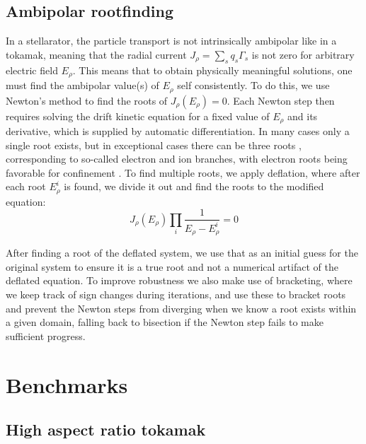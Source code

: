 \documentclass[11pt]{article}
\begin{document}
\subsection{Ambipolar rootfinding}
\label{sec:ambipolar}

In a stellarator, the particle transport is not intrinsically ambipolar like in a tokamak,
meaning that the radial current $J_\rho = \sum_s q_s \Gamma_s$ is not zero for arbitrary
electric field $E_\rho$. This means that to obtain physically meaningful solutions,
one must find the ambipolar value(s) of $E_\rho$ self consistently. To do this, we use
Newton's method to find the roots of $J_\rho(E_\rho) = 0$. Each Newton step then requires
solving the drift kinetic equation for a fixed value of $E_\rho$ and its derivative, which
is supplied by automatic differentiation. In many cases only a single root exists, but
in exceptional cases there can be three roots \cite{hastings1985ambipolar}, corresponding
to so-called electron and ion branches, with electron roots being favorable for
confinement \cite{helander2024optimised}. To find multiple roots, we apply deflation,
where after each root $E_\rho^i$ is found, we divide it out and find the roots to the
modified equation:
\begin{equation}
J_\rho(E_\rho)\prod_i \frac{1}{E_\rho - E_\rho^i} = 0
\end{equation}

After finding a root of the deflated system, we use that as an initial guess for the
original system to ensure it is a true root and not a numerical artifact of the deflated
equation. To improve robustness we also make use of bracketing, where we keep track of
sign changes during iterations, and use these to bracket roots and prevent the Newton
steps from diverging when we know a root exists within a given domain, falling back to
bisection if the Newton step fails to make sufficient progress.


\section{Benchmarks}
\label{sec:benchmarks}


\subsection{High aspect ratio tokamak}
\label{sec:benchmark-circular}
\end{document}
